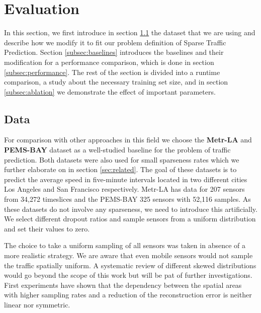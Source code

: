 
\section{Evaluation}

In this section, we first introduce in section \ref{subsec:data} the dataset that we are using and describe how we modify it to fit our problem definition of Sparse Traffic Prediction. 
Section \ref{subsec:baselines} introduces the baselines and their modification for a performance comparison, which is done in section \ref{subsec:performance}.
The rest of the section is divided into a runtime comparison, a study about the necessary training set size, and in section \ref{subsec:ablation} we demonstrate the effect of important parameters.


\subsection{Data}
\label{subsec:data}

For comparison with other approaches in this field we choose the \textbf{Metr-LA} \cite{Li2018} and \textbf{PEMS-BAY} \cite{pems} dataset as a well-studied baseline for the problem of traffic prediction.
Both datasets were also used for small sparseness rates which we further elaborate on in section \ref{sec:related}.
The goal of these datasets is to predict the average speed in five-minute intervals located in two different cities Los Angeles and San Francisco respectively.
Metr-LA has data for 207 sensors from 34,272 timeslices and the PEMS-BAY 325 sensors with 52,116 samples.
As these datasets do not involve any sparseness, we need to introduce this artificially.
We select different dropout ratios and sample sensors from a uniform distribution and set their values to zero.


The choice to take a uniform sampling of all sensors was taken in absence of a more realistic strategy.
We are aware that even mobile sensors would not sample the traffic spatially uniform.
A systematic review of different skewed distributions would go beyond the scope of this work but will be pat of further investigations.
First experiments have shown that the dependency between the spatial areas with higher sampling rates and a reduction of the reconstruction error is neither linear nor symmetric.



